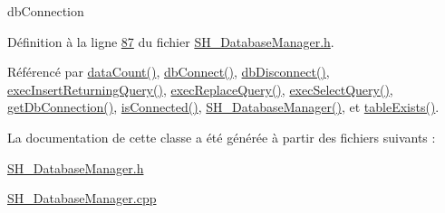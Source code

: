 db\-Connection 



Définition à la ligne \hyperlink{SH__DatabaseManager_8h_source_l00087}{87} du fichier \hyperlink{SH__DatabaseManager_8h_source}{S\-H\-\_\-\-Database\-Manager.\-h}.



Référencé par \hyperlink{classSH__DatabaseManager_ad3e372d89b60b43e3f3bae649be6d7fb}{data\-Count()}, \hyperlink{classSH__DatabaseManager_aeb077fe5437f435c0cbe8d77d96dd846}{db\-Connect()}, \hyperlink{classSH__DatabaseManager_a3716cf1a5f521cc49584dbcb2fab28bf}{db\-Disconnect()}, \hyperlink{classSH__DatabaseManager_a1c0399265021ed79a1c07a0e01c7a5dc}{exec\-Insert\-Returning\-Query()}, \hyperlink{classSH__DatabaseManager_aa42b90708c2fdb89588cb67d2e4f8ad7}{exec\-Replace\-Query()}, \hyperlink{classSH__DatabaseManager_ab8f9850cb68444ab9a4e613b36a3b044}{exec\-Select\-Query()}, \hyperlink{classSH__DatabaseManager_adf7c1e261fd3feed3dea6614d8a80d5f}{get\-Db\-Connection()}, \hyperlink{classSH__DatabaseManager_ab125b77320dca843740fc9928fbbe16f}{is\-Connected()}, \hyperlink{classSH__DatabaseManager_a7b5d0e372c153eb59cdab98588994904}{S\-H\-\_\-\-Database\-Manager()}, et \hyperlink{classSH__DatabaseManager_af83a53b26cee86b3194cac14928115ed}{table\-Exists()}.



La documentation de cette classe a été générée à partir des fichiers suivants \-:\begin{DoxyCompactItemize}
\item 
\hyperlink{SH__DatabaseManager_8h}{S\-H\-\_\-\-Database\-Manager.\-h}\item 
\hyperlink{SH__DatabaseManager_8cpp}{S\-H\-\_\-\-Database\-Manager.\-cpp}\end{DoxyCompactItemize}
